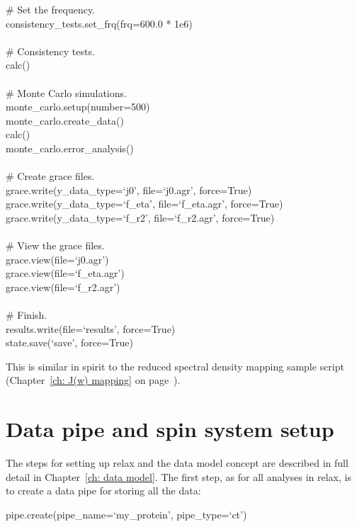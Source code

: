 \begin{exampleenv}
\# Set the frequency. \\
consistency\_tests.set\_frq(frq=600.0 * 1e6) \\
 \\
\# Consistency tests. \\
calc() \\
 \\
\# Monte Carlo simulations. \\
monte\_carlo.setup(number=500) \\
monte\_carlo.create\_data() \\
calc() \\
monte\_carlo.error\_analysis() \\
 \\
\# Create grace files. \\
grace.write(y\_data\_type=`j0', file=`j0.agr', force=True) \\
grace.write(y\_data\_type=`f\_eta', file=`f\_eta.agr', force=True) \\
grace.write(y\_data\_type=`f\_r2', file=`f\_r2.agr', force=True) \\
 \\
\# View the grace files. \\
grace.view(file=`j0.agr') \\
grace.view(file=`f\_eta.agr') \\
grace.view(file=`f\_r2.agr') \\
 \\
\# Finish. \\
results.write(file=`results', force=True) \\
state.save(`save', force=True)
\end{exampleenv}

This is similar in spirit to the reduced spectral density mapping sample script (Chapter~\ref{ch: J(w) mapping} on page~\pageref{ch: J(w) mapping}).



\section{Data pipe and spin system setup}

The steps for setting up relax and the data model concept are described in full detail in Chapter~\ref{ch: data model}.  The first step, as for all analyses in relax, is to create a data pipe for storing all the data:

\begin{exampleenv}
pipe.create(pipe\_name=`my\_protein', pipe\_type=`ct')
\end{exampleenv}

